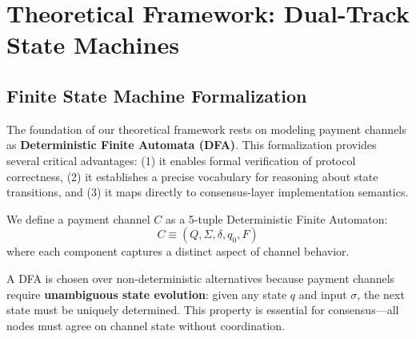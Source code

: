 \section{Theoretical Framework: Dual-Track State Machines}

\subsection{Finite State Machine Formalization}

The foundation of our theoretical framework rests on modeling payment channels as \textbf{Deterministic Finite Automata (DFA)}. This formalization provides several critical advantages: (1) it enables formal verification of protocol correctness, (2) it establishes a precise vocabulary for reasoning about state transitions, and (3) it maps directly to consensus-layer implementation semantics.

\begin{definition}
We define a payment channel $C$ as a 5-tuple Deterministic Finite Automaton:
$$C \equiv (Q, \Sigma, \delta, q_0, F)$$
where each component captures a distinct aspect of channel behavior.
\end{definition}

A DFA is chosen over non-deterministic alternatives because payment channels require \textbf{unambiguous state evolution}: given any state $q$ and input $\sigma$, the next state must be uniquely determined. This property is essential for consensus---all nodes must agree on channel state without coordination.


